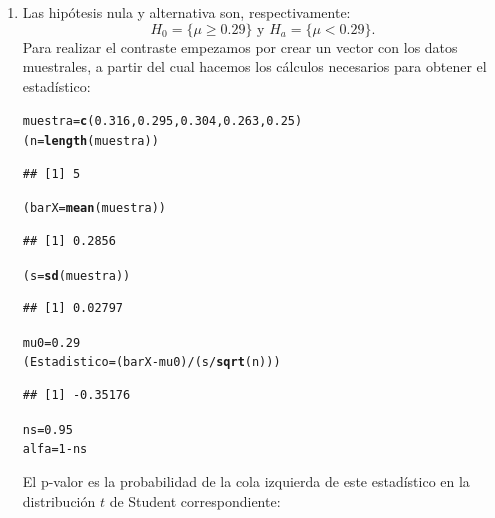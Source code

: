 \documentclass[10pt,a4paper]{article}\usepackage[]{graphicx}\usepackage[]{color}
\makeatletter
\newcommand{\hlnum}[1]{\textcolor[rgb]{0.686,0.059,0.569}{#1}}%
\newcommand{\hlopt}[1]{\textcolor[rgb]{0,0,0}{#1}}%
\newcommand{\hlstd}[1]{\textcolor[rgb]{0.345,0.345,0.345}{#1}}%
\newcommand{\hlkwb}[1]{\textcolor[rgb]{0.69,0.353,0.396}{#1}}%
\newcommand{\hlkwd}[1]{\textcolor[rgb]{0.737,0.353,0.396}{\textbf{#1}}}%
\newenvironment{kframe}{%
 \def\at@end@of@kframe{}%
 \ifinner\ifhmode%
  \def\at@end@of@kframe{\end{minipage}}%
  \begin{minipage}{\columnwidth}%
 \fi\fi%
 \def\FrameCommand##1{\hskip\@totalleftmargin \hskip-\fboxsep
 \colorbox{shadecolor}{##1}\hskip-\fboxsep
     \hskip-\linewidth \hskip-\@totalleftmargin \hskip\columnwidth}%
 \MakeFramed {\advance\hsize-\width
   \@totalleftmargin\z@ \linewidth\hsize
   \@setminipage}}%
 {\par\unskip\endMakeFramed%
 \at@end@of@kframe}
\newenvironment{knitrout}{}{} %
\newcounter {cont01}
\makeatother
\begin{document}
\begin{enumerate}

  \item Las hipótesis nula y alternativa son, respectivamente:
  \[H_0=\{\mu \geq 0.29 \}\mbox{ y }H_a=\{\mu < 0.29 \}.\]
  Para realizar el contraste empezamos por crear un vector con los datos muestrales, a partir del cual hacemos los cálculos necesarios para obtener el estadístico:
\begin{knitrout}
\color{fgcolor}\begin{kframe}
\begin{alltt}
\hlstd{muestra} \hlkwb{=} \hlkwd{c}\hlstd{(}\hlnum{0.316}\hlstd{,} \hlnum{0.295}\hlstd{,} \hlnum{0.304}\hlstd{,} \hlnum{0.263}\hlstd{,} \hlnum{0.25}\hlstd{)}
\hlstd{(n} \hlkwb{=} \hlkwd{length}\hlstd{(muestra))}
\end{alltt}
\begin{verbatim}
## [1] 5
\end{verbatim}
\begin{alltt}
\hlstd{(barX} \hlkwb{=} \hlkwd{mean}\hlstd{(muestra))}
\end{alltt}
\begin{verbatim}
## [1] 0.2856
\end{verbatim}
\begin{alltt}
\hlstd{(s} \hlkwb{=} \hlkwd{sd}\hlstd{(muestra))}
\end{alltt}
\begin{verbatim}
## [1] 0.02797
\end{verbatim}
\begin{alltt}
\hlstd{mu0} \hlkwb{=} \hlnum{0.29}
\hlstd{(Estadistico} \hlkwb{=} \hlstd{(barX} \hlopt{-} \hlstd{mu0)} \hlopt{/} \hlstd{(s}\hlopt{/}\hlkwd{sqrt}\hlstd{(n)))}
\end{alltt}
\begin{verbatim}
## [1] -0.35176
\end{verbatim}
\begin{alltt}
\hlstd{ns} \hlkwb{=} \hlnum{0.95}
\hlstd{alfa} \hlkwb{=} \hlnum{1} \hlopt{-} \hlstd{ns}
\end{alltt}
\end{kframe}
\end{knitrout}
  El p-valor es la probabilidad de la cola izquierda de este estadístico en la distribución $t$ de Student correspondiente:
\begin{knitrout}
\color{fgcolor}\begin{kframe}

\end{kframe}
\end{knitrout}
\end{enumerate}
\end{document}
